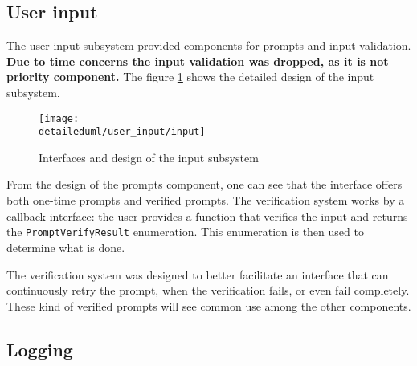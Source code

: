 \subsection{User input}

The user input subsystem provided components for prompts and input validation.
\textbf{Due to time concerns the input validation was dropped, as it is not
priority component.} The figure \ref{dia:prompts_design} shows the detailed
design of the input subsystem.

\begin{figure}[H]
    \centering
    \centerline{\texttt{[image: \\detaileduml/user\_input/input]}}
    \caption{Interfaces and design of the input subsystem}
    \label{dia:prompts_design}
\end{figure}

From the design of the prompts component, one can see that the interface offers
both one-time prompts and verified prompts. The verification system works by
a callback interface: the user provides a function that verifies the input and
returns the \texttt{PromptVerifyResult} enumeration. This enumeration is then
used to determine what is done.

The verification system was designed to better facilitate an interface that
can continuously retry the prompt, when the verification fails, or even fail
completely. These kind of verified prompts will see common use among the other
components.

\subsection{Logging}
